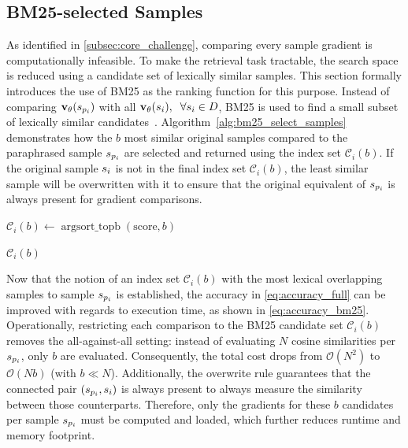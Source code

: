 \subsection{BM25-selected Samples}\label{subsec:bm25_selection}
As identified in \autoref{subsec:core_challenge}, comparing every sample gradient is computationally infeasible. To make the retrieval task tractable, the search space is reduced using a candidate set of lexically similar samples. This section formally introduces the use of BM25 as the ranking function for this purpose. Instead of comparing $\mathbf{v}_{\theta}(s_{p_i})$ with all $\mathbf{v}_{\theta}(s_i), \;\; \forall s_i \in D$, BM25 is used to find a small subset of lexically similar candidates~\cite{DBLP:journals/ftir/RobertsonZ09}. Algorithm~\ref{alg:bm25_select_samples} demonstrates how the $b$ most similar original samples compared to the paraphrased sample $s_{p_i}$ are selected and returned using the index set $\mathcal{C}_i(b)$. If the original sample $s_i$ is not in the final index set $\mathcal{C}_i(b)$, the least similar sample will be overwritten with it to ensure that the original equivalent of $s_{p_i}$ is always present for gradient comparisons.
\begin{algorithm}[ht]
\caption{Retrieve the $b$ Most Similar Original Samples via BM25}
\label{alg:bm25_select_samples}


\DontPrintSemicolon
{}
$\mathcal{C}_i(b) \gets \operatorname{argsort\_topb}(\text{score}, b)$\; 


\Return $\mathcal{C}_i(b)$
\end{algorithm}
Now that the notion of an index set $\mathcal{C}_i(b)$ with the most lexical overlapping samples to sample $s_{p_i}$ is established, the accuracy in \autoref{eq:accuracy_full} can be improved with regards to execution time, as shown in \autoref{eq:accuracy_bm25}. Operationally, restricting each comparison to the BM25 candidate set $\mathcal{C}_i(b)$ removes the all-against-all setting: instead of evaluating $N$ cosine similarities per $s_{p_i}$, only $b$ are evaluated. Consequently, the total cost drops from $\mathcal{O}(N^2)$ to $\mathcal{O}(Nb)$ (with $b \ll N$). Additionally, the overwrite rule guarantees that the connected pair $(s_{p_i},s_i)$ is always present to always measure the similarity between those counterparts. Therefore, only the gradients for these $b$ candidates per sample $s_{p_i}$ must be computed and loaded, which further reduces runtime and memory footprint.
